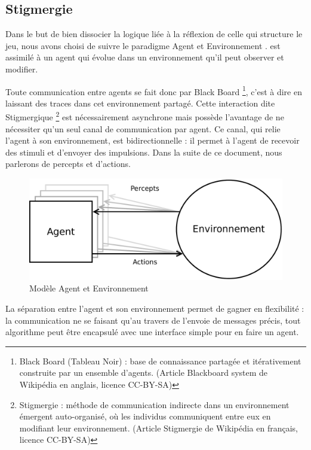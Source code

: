 \subsection{ \og Stigmergie \fg{} }

Dans le but de bien dissocier la logique liée à la réflexion de celle qui structure le jeu, nous avons choisi de suivre le paradigme \og Agent et Environnement \fg{}. \cogito{} est assimilé à un agent qui évolue dans un environnement qu'il peut observer et modifier.

Toute communication entre agents se fait donc par \og Black Board \fg{}\footnote{ \og Black Board \fg{} (Tableau Noir) : base de connaissance partagée et itérativement construite par un ensemble d'agents. (Article \og Blackboard system \fg{} de Wikipédia en anglais, licence CC-BY-SA)}, c'est à dire en laissant des traces dans cet environnement partagé. Cette interaction dite \og Stigmergique \fg{}\footnote{\og Stigmergie \fg{} : méthode de communication indirecte dans un environnement émergent auto-organisé, où les individus communiquent entre eux en modifiant leur environnement. (Article \og Stigmergie \fg{} de Wikipédia en français, licence CC-BY-SA)} est nécessairement asynchrone mais possède l'avantage de ne nécessiter qu'un seul canal de communication par agent. Ce canal, qui relie l'agent à son environnement, est bidirectionnelle : il permet à l'agent de recevoir des stimuli et d'envoyer des impulsions. Dans la suite de ce document, nous parlerons de \og percepts\fg{} et d'\og actions\fg{}.

\begin{figure}[H] 
\centering
\includegraphics[width=\textwidth]{files/env/agent_env} 
\caption{Modèle \og Agent et Environnement \fg{}} 
\label{agent_env}
\end{figure}

La séparation entre l'agent et son environnement permet de gagner en flexibilité : la communication ne se faisant qu'au travers de l'envoie de messages précis, tout algorithme peut être encapsulé avec une interface simple pour en faire un agent.


